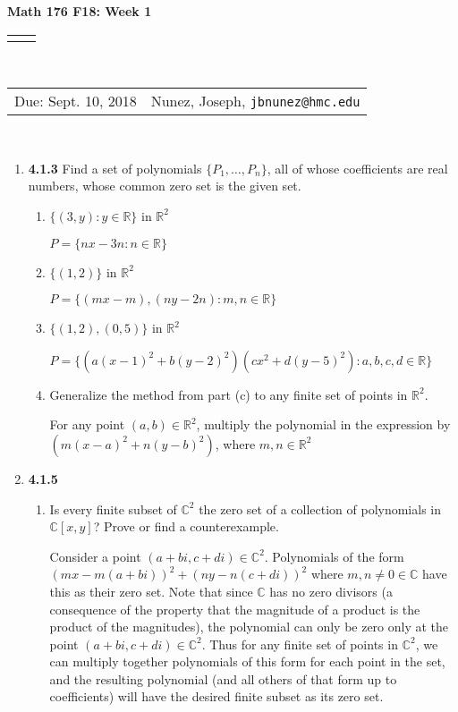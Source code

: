 \documentclass[12pt]{article}
\renewcommand{\title}[1]{\textbf{#1}\\}
\renewcommand{\line}{\begin{tabularx}{\textwidth}{X>{\raggedleft}X}\hline\\\end{tabularx}\\[-0.5cm]}
\newcommand{\leftright}[2]{\begin{tabularx}{\textwidth}{X>{\raggedleft}X}#1%
& #2\\\end{tabularx}\\[-0.5cm]}
\newcommand{\R}{\mathbb{R}}
\newcommand{\C}{\mathbb{C}}
\begin{document}
\title{Math 176 F18: Week 1}
\line
\leftright{Due: Sept. 10, 2018}{Nunez, Joseph, \texttt{jbnunez@hmc.edu}} %



\begin{enumerate}
 

    \item \textbf{4.1.3} Find a set of polynomials $\{P_1,\dots,P_n\}$, all of whose coefficients are real numbers, whose common zero set is the given set.  
    \begin{enumerate}
     
	\item $\{(3,y): y\in \R \}$ in $\R^2$
	
	$P=\{n x - 3n: n\in \R\}$
	
     \item $\{(1,2) \}$ in $\R^2$
     
     $P=\{(mx - m),(ny - 2n): m,n\in \R\}$
     
     \item $\{(1,2), (0,5)\}$ in $\R^2$
     
     $P = \{(a(x-1)^2+b(y-2)^2)(cx^2+d(y-5)^2): a,b,c,d\in\R\}$
     
     \item Generalize the method from part (c) to any finite set of points in $\R^2$.  
     
     For any point $(a,b)\in \R^2$, multiply the polynomial in the expression by $(m(x-a)^2+n(y-b)^2)$, where $m,n\in\R^2$
     
    \end{enumerate}
    
    
    \item \textbf{4.1.5}  
    \begin{enumerate}
    
    \item Is every finite subset of $\C^2$ the zero set of a collection of polynomials in $\C[x,y]$? Prove or find a counterexample.
    
    Consider a point $(a+bi, c+di) \in \C^2$.  Polynomials of the form $(mx-m(a+bi))^2+(ny-n(c+di))^2$ where $m,n \neq 0 \in \C$ have this as their zero set.  Note that since $\C$ has no zero divisors (a consequence of the property that the magnitude of a product is the product of the magnitudes), the polynomial can only be zero only at the point $(a+bi, c+di) \in \C^2$.  Thus for any finite set of points in $\C^2$, we can multiply together polynomials of this form for each point in the set, and the resulting polynomial (and all others of that form up to coefficients) will have the desired finite subset as its zero set.
    

\end{enumerate}
\end{enumerate}
\end{document}
